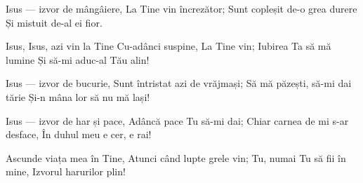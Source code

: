 \beginverse
Isus — izvor de mângâiere,
La Tine vin încrezător;
Sunt copleșit de-o grea durere
Și mistuit de-al ei fior.
\endverse

\beginchorus
Isus, Isus, azi vin la Tine
Cu-adânci suspine,
La Tine vin;
Iubirea Ta să mă lumine
Și să-mi aduc-al Tău alin!
\endchorus

\beginverse
Isus — izvor de bucurie,
Sunt întristat azi de vrăjmași;
Să mă păzești, să-mi dai tărie
Și-n mâna lor să nu mă lași!
\endverse

\beginverse
Isus — izvor de har și pace,
Adâncă pace Tu să-mi dai;
Chiar carnea de mi s-ar desface,
În duhul meu e cer, e rai!
\endverse

\beginverse
Ascunde viața mea în Tine,
Atunci când lupte grele vin;
Tu, numai Tu să fii în mine,
Izvorul harurilor plin!
\endverse
\endsong